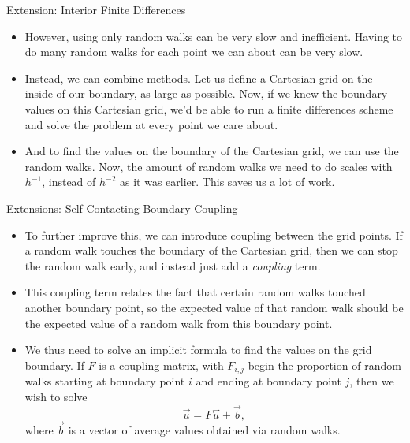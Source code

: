 \documentclass{beamer}
\newcommand\mat[1]{#1}
\begin{document}
\begin{frame}{Extension: Interior Finite Differences}
\begin{itemize}
\item However, using only random walks can be very slow and inefficient.
Having to do many random walks for each point we can about can be very slow.
\item Instead, we can combine methods.
Let us define a Cartesian grid on the inside of our boundary,
as large as possible.
Now, if we knew the boundary values on this Cartesian grid,
we'd be able to run a finite differences scheme
and solve the problem at every point we care about.
\item And to find the values on the boundary of the Cartesian grid,
we can use the random walks.
Now, the amount of random walks we need to do scales with $h^{-1}$,
instead of $h^{-2}$ as it was earlier.
This saves us a lot of work.
\end{itemize}
\end{frame}

\begin{frame}{Extensions: Self-Contacting Boundary Coupling}
\begin{itemize}
\item To further improve this,
we can introduce coupling between the grid points.
If a random walk touches the boundary of the Cartesian grid,
then we can stop the random walk early,
and instead just add a \emph{coupling} term.
\item This coupling term relates the fact that certain random walks
touched another boundary point, so the expected value of that random walk
should be the expected value of a random walk from this boundary point.
\item We thus need to solve an implicit formula
to find the values on the grid boundary.
If $\mat{F}$ is a coupling matrix,
with $F_{i,j}$ begin the proportion of random walks
starting at boundary point $i$ and ending at boundary point $j$,
then we wish to solve
$$\vec{u}=\mat{F}\vec{u}+\vec{b},$$
where $\vec{b}$ is a vector of average values obtained via random walks.
\end{itemize}
\end{frame}
\end{document}
